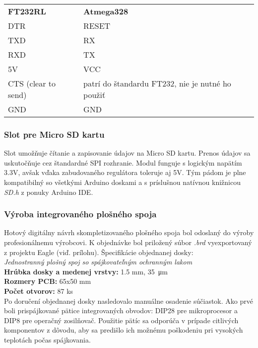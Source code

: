 \documentclass[titlepage]{article}
\begin{document}
\begin{table}[htb]
\begin{tabular}{ll}
\textbf{FT232RL}  	& \textbf{Atmega328}   \\
DTR          		& RESET                \\
TXD			 		& RX                   \\
RXD					& TX				   \\
5V					& VCC				   \\
CTS (clear to send) & patrí do štandardu FT232, nie je nutné ho použiť \\
GND					& GND
\end{tabular}
\end{table}

\subsubsection*{Slot pre Micro SD kartu}
Slot umožňuje čítanie a zapisovanie údajov na Micro SD kartu. Prenos údajov sa uskutočňuje cez štandardné SPI rozhranie. Modul funguje s logickým napätím 3.3V, avšak vďaka zabudovaného regulátora toleruje aj 5V. Tým pádom je plne kompatibilný so všetkými Arduino doskami a s príslušnou natívnou knižnicou \emph{SD.h} z ponuky Arduino IDE.

\subsubsection*{Výroba integrovaného plošného spoja}
Hotový digitálny návrh skompletizovaného plošného spoja bol odoslaný do výroby profesionálnemu výrobcovi. K objednávke bol priložený súbor \textit{.brd} vyexportovaný z projektu Eagle (viď. prílohu). Špecifikácie objednanej dosky: \\
\emph{Jednostranný plošný spoj so spájkovateľným ochranným lakom} \\
\textbf{Hrúbka dosky a medenej vrstvy:} 1.5 mm, \SI{35}{\micro\m} \\
\textbf{Rozmery PCB:} 65x50 mm \\
\textbf{Počet otvorov:} 87 ks \\

Po doručení objednanej dosky nasledovalo manuálne osadenie súčiastok. Ako prvé boli prispájkované pätice integrovaných obvodov: DIP28 pre mikroprocesor a DIP8 pre operačný zosilňovač. Použitie pätíc sa odporúča v prípade citlivých komponentov z dôvodu, aby sa predišlo ich možnému poškodeniu pri vysokých teplotách počas spájkovania.
\end{document}
